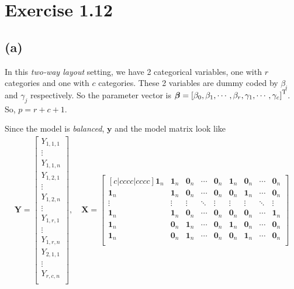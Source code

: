 \section*{Exercise 1.12}
\subsection*{(a)}
In this \textit{two-way layout} setting, we have 2 categorical variables, one with $r$ categories and one with $c$ categories. These 2 variables are dummy coded by $\beta_{i}$ and $\gamma_{j}$ respectively. So the parameter vector is $\bm{\beta} = \left[\beta_{0}, \beta_{1}, \cdots, \beta_{r}, \gamma_{1}, \cdots, \gamma_{c} \right]^{\rm T}$. So, $p = r+c+1$.

Since the model is \textit{balanced}, $\bm{y}$ and the model matrix look like
\begin{align*}
\bm{Y} = 
\begin{bmatrix}
Y_{1,1,1}\\
\vdots\\
Y_{1,1,n}\\
Y_{1,2,1}\\
\vdots\\
Y_{1,2,n}\\
\vdots\\
Y_{1,r,1}\\
\vdots\\
Y_{1,r,n}\\
Y_{2,1,1}\\
\vdots\\
Y_{r,c,n}\\
\end{bmatrix}
, \quad
\bm{X} = 
\begin{bmatrix}[c|cccc|cccc]
\bm{1}_{n} & \bm{1}_{n} & \bm{0}_{n} & \cdots & \bm{0}_{n} & \bm{1}_{n} & \bm{0}_{n} & \cdots & \bm{0}_{n}\\
\bm{1}_{n} & \bm{1}_{n} & \bm{0}_{n} & \cdots & \bm{0}_{n} & \bm{0}_{n} & \bm{1}_{n} & \cdots & \bm{0}_{n}\\
\vdots & \vdots & \vdots & \ddots & \vdots & \vdots & \vdots & \ddots & \vdots\\
\bm{1}_{n} & \bm{1}_{n} & \bm{0}_{n} & \cdots & \bm{0}_{n} & \bm{0}_{n} & \bm{0}_{n} & \cdots & \bm{1}_{n}\\
\hline
\bm{1}_{n} & \bm{0}_{n} & \bm{1}_{n} & \cdots & \bm{0}_{n} & \bm{1}_{n} & \bm{0}_{n} & \cdots & \bm{0}_{n}\\
\bm{1}_{n} & \bm{0}_{n} & \bm{1}_{n} & \cdots & \bm{0}_{n} & \bm{0}_{n} & \bm{1}_{n} & \cdots & \bm{0}_{n}\\

\end{bmatrix}
\end{align*}
